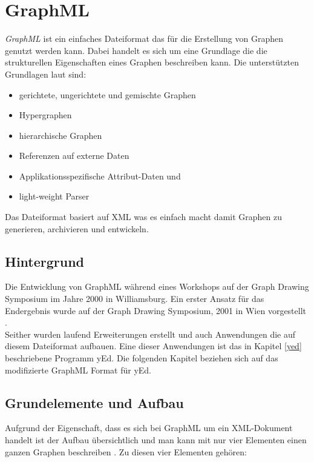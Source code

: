 
\section{GraphML}
\prc

\textit{GraphML} ist ein einfaches Dateiformat das für die Erstellung von Graphen genutzt werden kann. Dabei handelt es sich um eine Grundlage die die strukturellen Eigenschaften eines Graphen beschreiben kann. Die unterstützten Grundlagen laut \cite{graphml} sind:

\begin{itemize}
	\item gerichtete, ungerichtete und gemischte Graphen
	\item Hypergraphen
	\item hierarchische Graphen
	\item Referenzen auf externe Daten
	\item Applikationsspezifische Attribut-Daten und
	\item light-weight Parser
\end{itemize}

\noindent
Das Dateiformat basiert auf XML was es einfach macht damit Graphen zu generieren, archivieren und entwickeln.

\subsection{Hintergrund}

Die Entwicklung von GraphML während eines Workshops auf der Graph Drawing Symposium im Jahre 2000 in Williamsburg. Ein erster Ansatz für das Endergebnis wurde auf der Graph Drawing Symposium, 2001 in Wien vorgestellt .
\\

\noindent
Seither wurden laufend Erweiterungen erstellt und auch Anwendungen die auf diesem Dateiformat aufbauen. Eine dieser Anwendungen ist das in Kapitel \ref{yed} beschriebene Programm yEd. Die folgenden Kapitel beziehen sich auf das modifizierte GraphML Format für yEd.

\subsection{Grundelemente und Aufbau}

Aufgrund der Eigenschaft, dass es sich bei GraphML um ein XML-Dokument handelt ist der Aufbau übersichtlich und man kann mit nur vier Elementen einen ganzen Graphen beschreiben . Zu diesen vier Elementen gehören:

